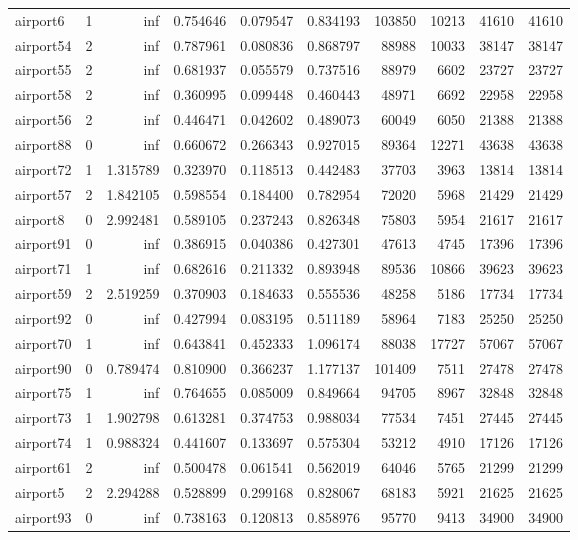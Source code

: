 \begin{longtable}{|l|r|r|r|r|r|r|r|r|r|}
airport6 & 1 & inf & 0.754646 & 0.079547 & 0.834193 & 103850 & 10213 & 41610 & 41610 \\
airport54 & 2 & inf & 0.787961 & 0.080836 & 0.868797 & 88988 & 10033 & 38147 & 38147 \\
airport55 & 2 & inf & 0.681937 & 0.055579 & 0.737516 & 88979 & 6602 & 23727 & 23727 \\
airport58 & 2 & inf & 0.360995 & 0.099448 & 0.460443 & 48971 & 6692 & 22958 & 22958 \\
airport56 & 2 & inf & 0.446471 & 0.042602 & 0.489073 & 60049 & 6050 & 21388 & 21388 \\
airport88 & 0 & inf & 0.660672 & 0.266343 & 0.927015 & 89364 & 12271 & 43638 & 43638 \\
airport72 & 1 & 1.315789 & 0.323970 & 0.118513 & 0.442483 & 37703 & 3963 & 13814 & 13814 \\
airport57 & 2 & 1.842105 & 0.598554 & 0.184400 & 0.782954 & 72020 & 5968 & 21429 & 21429 \\
airport8 & 0 & 2.992481 & 0.589105 & 0.237243 & 0.826348 & 75803 & 5954 & 21617 & 21617 \\
airport91 & 0 & inf & 0.386915 & 0.040386 & 0.427301 & 47613 & 4745 & 17396 & 17396 \\
airport71 & 1 & inf & 0.682616 & 0.211332 & 0.893948 & 89536 & 10866 & 39623 & 39623 \\
airport59 & 2 & 2.519259 & 0.370903 & 0.184633 & 0.555536 & 48258 & 5186 & 17734 & 17734 \\
airport92 & 0 & inf & 0.427994 & 0.083195 & 0.511189 & 58964 & 7183 & 25250 & 25250 \\
airport70 & 1 & inf & 0.643841 & 0.452333 & 1.096174 & 88038 & 17727 & 57067 & 57067 \\
airport90 & 0 & 0.789474 & 0.810900 & 0.366237 & 1.177137 & 101409 & 7511 & 27478 & 27478 \\
airport75 & 1 & inf & 0.764655 & 0.085009 & 0.849664 & 94705 & 8967 & 32848 & 32848 \\
airport73 & 1 & 1.902798 & 0.613281 & 0.374753 & 0.988034 & 77534 & 7451 & 27445 & 27445 \\
airport74 & 1 & 0.988324 & 0.441607 & 0.133697 & 0.575304 & 53212 & 4910 & 17126 & 17126 \\
airport61 & 2 & inf & 0.500478 & 0.061541 & 0.562019 & 64046 & 5765 & 21299 & 21299 \\
airport5 & 2 & 2.294288 & 0.528899 & 0.299168 & 0.828067 & 68183 & 5921 & 21625 & 21625 \\
airport93 & 0 & inf & 0.738163 & 0.120813 & 0.858976 & 95770 & 9413 & 34900 & 34900 \\

\end{longtable}
